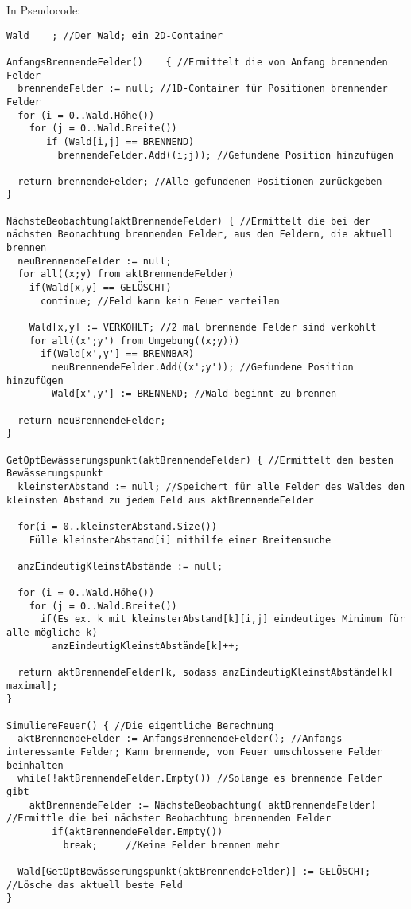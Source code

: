 In Pseudocode:
{\small
\begin{lstlisting}
Wald	; //Der Wald; ein 2D-Container

AnfangsBrennendeFelder()	{ //Ermittelt die von Anfang brennenden Felder
  brennendeFelder := null; //1D-Container für Positionen brennender Felder
  for (i = 0..Wald.Höhe())
    for (j = 0..Wald.Breite())
       if (Wald[i,j] == BRENNEND)
         brennendeFelder.Add((i;j)); //Gefundene Position hinzufügen
         
  return brennendeFelder; //Alle gefundenen Positionen zurückgeben
}

NächsteBeobachtung(aktBrennendeFelder) { //Ermittelt die bei der nächsten Beonachtung brennenden Felder, aus den Feldern, die aktuell brennen
  neuBrennendeFelder := null;
  for all((x;y) from aktBrennendeFelder)
    if(Wald[x,y] == GELÖSCHT)
      continue; //Feld kann kein Feuer verteilen
      
    Wald[x,y] := VERKOHLT; //2 mal brennende Felder sind verkohlt
    for all((x';y') from Umgebung((x;y)))
      if(Wald[x',y'] == BRENNBAR)
        neuBrennendeFelder.Add((x';y')); //Gefundene Position hinzufügen
        Wald[x',y'] := BRENNEND; //Wald beginnt zu brennen
        
  return neuBrennendeFelder;
}

GetOptBewässerungspunkt(aktBrennendeFelder) { //Ermittelt den besten Bewässerungspunkt
  kleinsterAbstand := null; //Speichert für alle Felder des Waldes den kleinsten Abstand zu jedem Feld aus aktBrennendeFelder
  
  for(i = 0..kleinsterAbstand.Size())
  	Fülle kleinsterAbstand[i] mithilfe einer Breitensuche

  anzEindeutigKleinstAbstände := null;
  
  for (i = 0..Wald.Höhe())
    for (j = 0..Wald.Breite())
      if(Es ex. k mit kleinsterAbstand[k][i,j] eindeutiges Minimum für alle mögliche k)
        anzEindeutigKleinstAbstände[k]++;
  
  return aktBrennendeFelder[k, sodass anzEindeutigKleinstAbstände[k] maximal];
}

SimuliereFeuer() { //Die eigentliche Berechnung
  aktBrennendeFelder := AnfangsBrennendeFelder(); //Anfangs interessante Felder; Kann brennende, von Feuer umschlossene Felder beinhalten
  while(!aktBrennendeFelder.Empty()) //Solange es brennende Felder gibt
    aktBrennendeFelder := NächsteBeobachtung( aktBrennendeFelder) //Ermittle die bei nächster Beobachtung brennenden Felder
    	if(aktBrennendeFelder.Empty())
    	  break;	 //Keine Felder brennen mehr
    	
  Wald[GetOptBewässerungspunkt(aktBrennendeFelder)] := GELÖSCHT; //Lösche das aktuell beste Feld
}
\end{lstlisting}
}

